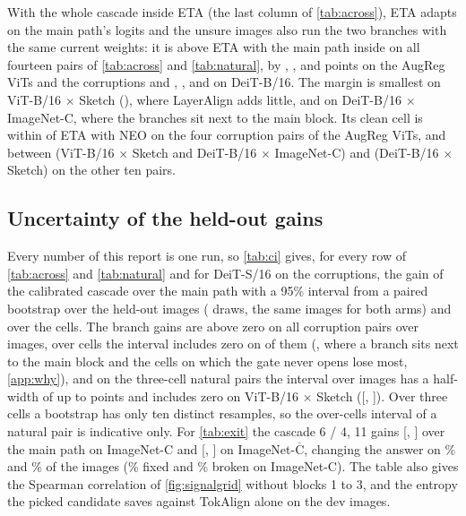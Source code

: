 \documentclass{article}
\newcommand{\tok}{TokAlign}
\newcommand{\layer}{LayerAlign}
\newcommand{\neo}{NEO}
\begin{document}
With the whole cascade inside ETA (the last column of \cref{tab:across}), ETA adapts on the main path's logits and the unsure images also run the two branches with the same current weights: it is above ETA with the main path inside on all fourteen pairs of \cref{tab:across} and \cref{tab:natural}, by , ,  and  points on the AugReg ViTs and the corruptions and , ,  and  on DeiT-B/16. The margin is smallest on ViT-B/16 $\times$ Sketch (), where \layer{} adds little, and on DeiT-B/16 $\times$ ImageNet-C, where the branches sit next to the main block. Its clean cell is within  of ETA with \neo{} on the four corruption pairs of the AugReg ViTs, and between  (ViT-B/16 $\times$ Sketch and DeiT-B/16 $\times$ ImageNet-C) and  (DeiT-B/16 $\times$ Sketch) on the other ten pairs.

\subsection{Uncertainty of the held-out gains}
\label{app:ci}
Every number of this report is one run, so \cref{tab:ci} gives, for every row of \cref{tab:across} and \cref{tab:natural} and for DeiT-S/16 on the corruptions, the gain of the calibrated cascade over the main path with a 95\% interval from a paired bootstrap over the held-out images ( draws, the same images for both arms) and over the cells. The branch gains are above zero on all  corruption pairs over images, over cells the interval includes zero on  of them (, where a branch sits next to the main block and the cells on which the gate never opens lose most, \cref{app:why}), and on the three-cell natural pairs the interval over images has a half-width of up to  points and includes zero on ViT-B/16 $\times$ Sketch ([, ]). Over three cells a bootstrap has only ten distinct resamples, so the over-cells interval of a natural pair is indicative only. For \cref{tab:exit} the cascade 6 / 4, 11 gains  [, ] over the main path on ImageNet-C and  [, ] on ImageNet-$\overline{\text{C}}$, changing the answer on \% and \% of the images (\% fixed and \% broken on ImageNet-C). The table also gives the Spearman correlation of \cref{fig:signalgrid} without blocks 1 to 3, and the entropy the picked candidate saves against \tok{} alone on the dev images.
\end{document}
